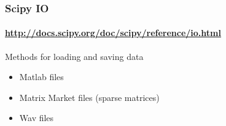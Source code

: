 \begin{frame}\frametitle{Scipy IO}
    \framesubtitle{\url{http://docs.scipy.org/doc/scipy/reference/io.html}}

    Methods for loading and saving data

    \begin{itemize}
        \item Matlab files
        \item Matrix Market files (sparse matrices)
        \item Wav files
    \end{itemize}

\end{frame}




